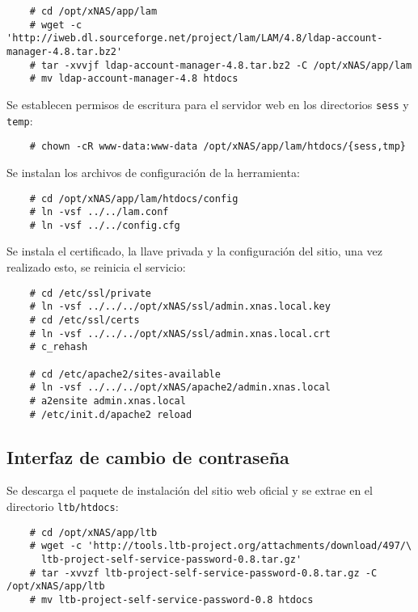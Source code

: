 {
\scriptsize
\linespread{1}
\begin{verbatim}
    # cd /opt/xNAS/app/lam
    # wget -c 'http://iweb.dl.sourceforge.net/project/lam/LAM/4.8/ldap-account-manager-4.8.tar.bz2'
    # tar -xvvjf ldap-account-manager-4.8.tar.bz2 -C /opt/xNAS/app/lam
    # mv ldap-account-manager-4.8 htdocs
\end{verbatim}
}

Se establecen permisos de escritura para el servidor web en los directorios \texttt{sess} y \texttt{temp}:

{
\scriptsize
\linespread{1}
\begin{verbatim}
    # chown -cR www-data:www-data /opt/xNAS/app/lam/htdocs/{sess,tmp}
\end{verbatim}
}

Se instalan los archivos de configuraci\'{o}n de la herramienta:

{
\scriptsize
\linespread{1}
\begin{verbatim}
    # cd /opt/xNAS/app/lam/htdocs/config
    # ln -vsf ../../lam.conf
    # ln -vsf ../../config.cfg
\end{verbatim}
}

Se instala el certificado, la llave privada y la configuraci\'{o}n del sitio, una vez realizado esto, se reinicia el servicio:

{
\scriptsize
\linespread{1}
\begin{verbatim}
    # cd /etc/ssl/private
    # ln -vsf ../../../opt/xNAS/ssl/admin.xnas.local.key
    # cd /etc/ssl/certs
    # ln -vsf ../../../opt/xNAS/ssl/admin.xnas.local.crt
    # c_rehash

    # cd /etc/apache2/sites-available
    # ln -vsf ../../../opt/xNAS/apache2/admin.xnas.local
    # a2ensite admin.xnas.local
    # /etc/init.d/apache2 reload
\end{verbatim}
}

      \subsection {Interfaz de cambio de contrase\~{n}a}

Se descarga el paquete de instalaci\'{o}n del sitio web oficial y se extrae en el directorio \texttt{ltb/htdocs}:

{
\scriptsize
\linespread{1}
\begin{verbatim}
    # cd /opt/xNAS/app/ltb
    # wget -c 'http://tools.ltb-project.org/attachments/download/497/\
      ltb-project-self-service-password-0.8.tar.gz'
    # tar -xvvzf ltb-project-self-service-password-0.8.tar.gz -C /opt/xNAS/app/ltb
    # mv ltb-project-self-service-password-0.8 htdocs
\end{verbatim}
}

